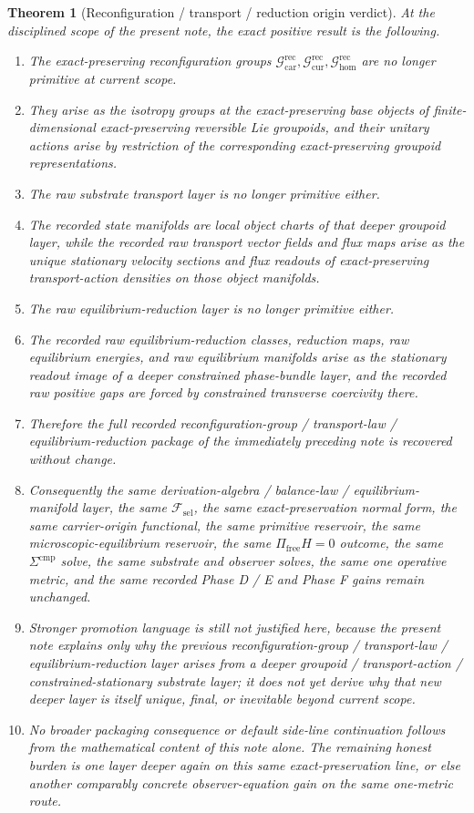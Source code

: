 \documentclass[11pt]{article}
\newcommand{\StemFunctional}{\mathscr F_{\mathrm{sel}}}
\newcommand{\TensorReconGroup}{\mathcal G_{\mathrm{car}}^{\mathrm{rec}}}
\newcommand{\CurReconGroup}{\mathcal G_{\mathrm{cur}}^{\mathrm{rec}}}
\newcommand{\HomReconGroup}{\mathcal G_{\mathrm{hom}}^{\mathrm{rec}}}
\newtheorem{theorem}{Theorem}
\begin{document}
\begin{theorem}[Reconfiguration / transport / reduction origin verdict]
\label{thm:verdict}
At the disciplined scope of the present note, the exact positive result is the following.
\begin{enumerate}
    \item The exact-preserving reconfiguration groups \(\TensorReconGroup,\CurReconGroup,\HomReconGroup\) are no longer primitive at current scope.
    \item They arise as the isotropy groups at the exact-preserving base objects of finite-dimensional exact-preserving reversible Lie groupoids, and their unitary actions arise by restriction of the corresponding exact-preserving groupoid representations.
    \item The raw substrate transport layer is no longer primitive either.
    \item The recorded state manifolds are local object charts of that deeper groupoid layer, while the recorded raw transport vector fields and flux maps arise as the unique stationary velocity sections and flux readouts of exact-preserving transport-action densities on those object manifolds.
    \item The raw equilibrium-reduction layer is no longer primitive either.
    \item The recorded raw equilibrium-reduction classes, reduction maps, raw equilibrium energies, and raw equilibrium manifolds arise as the stationary readout image of a deeper constrained phase-bundle layer, and the recorded raw positive gaps are forced by constrained transverse coercivity there.
    \item Therefore the full recorded reconfiguration-group / transport-law / equilibrium-reduction package of the immediately preceding note is recovered without change.
    \item Consequently the same derivation-algebra / balance-law / equilibrium-manifold layer, the same \(\StemFunctional\), the same exact-preservation normal form, the same carrier-origin functional, the same primitive reservoir, the same microscopic-equilibrium reservoir, the same \(\Pi_{\mathrm{free}}H=0\) outcome, the same \(\Sigma^{\mathrm{cmp}}\) solve, the same substrate and observer solves, the same one operative metric, and the same recorded Phase D / E and Phase F gains remain unchanged.
    \item Stronger promotion language is still not justified here, because the present note explains only why the previous reconfiguration-group / transport-law / equilibrium-reduction layer arises from a deeper groupoid / transport-action / constrained-stationary substrate layer; it does not yet derive why that new deeper layer is itself unique, final, or inevitable beyond current scope.
    \item No broader packaging consequence or default side-line continuation follows from the mathematical content of this note alone. The remaining honest burden is one layer deeper again on this same exact-preservation line, or else another comparably concrete observer-equation gain on the same one-metric route.
\end{enumerate}
\end{theorem}
\end{document}
